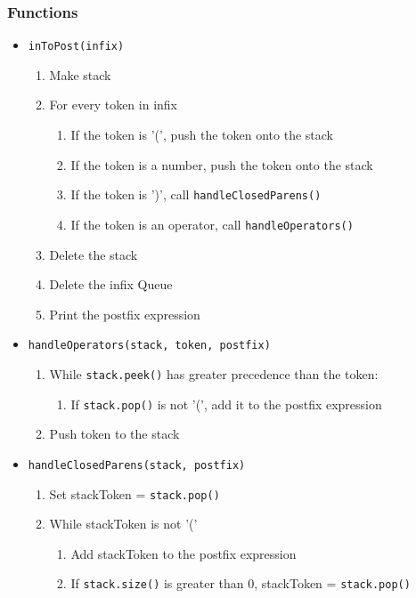 \documentclass{article}
\begin{document}
        \subsubsection{Functions}
        \begin{itemize}
            \item{\texttt{inToPost(infix)}}
                \begin{enumerate}
                    \item Make stack
                    \item For every token in infix
                    \begin{enumerate}
                        \item If the token is '(', push the token onto the stack
                        \item If the token is a number, push the token onto the stack
                        \item If the token is ')', call \texttt{handleClosedParens()}
                        \item If the token is an operator, call \texttt{handleOperators()}
                    \end{enumerate}
                    \item Delete the stack
                    \item Delete the infix Queue
                    \item Print the postfix expression
                \end{enumerate}

            \item{\texttt{handleOperators(stack, token, postfix)}}
                \begin{enumerate}
                    \item While \texttt{stack.peek()} has greater precedence than the token:
                    \begin{enumerate}
                        \item If \texttt{stack.pop()} is not '(', add it to the postfix expression
                    \end{enumerate}
                    \item Push token to the stack
                \end{enumerate}

            \item{\texttt{handleClosedParens(stack, postfix)}}
                \begin{enumerate}
                    \item Set stackToken = \texttt{stack.pop()}
                    \item While stackToken is not '('
                    \begin{enumerate}
                        \item Add stackToken to the postfix expression
                        \item If \texttt{stack.size()} is greater than 0, stackToken = \texttt{stack.pop()}
                    \end{enumerate}
                \end{enumerate}


\end{itemize}
\end{document}
